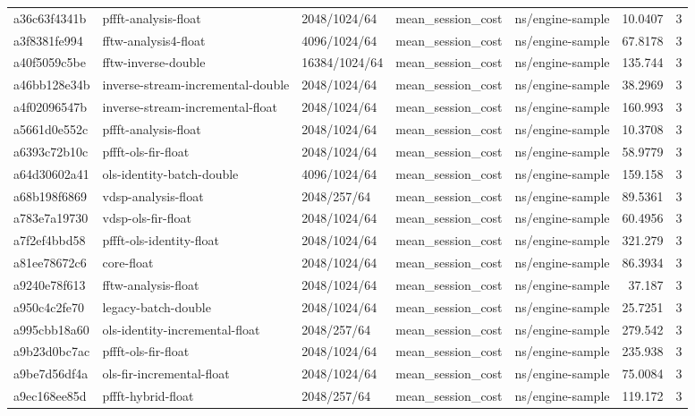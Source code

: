 \begin{longtable}{lllllrr}
a36c63f4341b & pffft-analysis-float & 2048/1024/64 & mean\_session\_cost & ns/engine-sample & 10.0407 & 3 \\
a3f8381fe994 & fftw-analysis4-float & 4096/1024/64 & mean\_session\_cost & ns/engine-sample & 67.8178 & 3 \\
a40f5059c5be & fftw-inverse-double & 16384/1024/64 & mean\_session\_cost & ns/engine-sample & 135.744 & 3 \\
a46bb128e34b & inverse-stream-incremental-double & 2048/1024/64 & mean\_session\_cost & ns/engine-sample & 38.2969 & 3 \\
a4f02096547b & inverse-stream-incremental-float & 2048/1024/64 & mean\_session\_cost & ns/engine-sample & 160.993 & 3 \\
a5661d0e552c & pffft-analysis-float & 2048/1024/64 & mean\_session\_cost & ns/engine-sample & 10.3708 & 3 \\
a6393c72b10c & pffft-ols-fir-float & 2048/1024/64 & mean\_session\_cost & ns/engine-sample & 58.9779 & 3 \\
a64d30602a41 & ols-identity-batch-double & 4096/1024/64 & mean\_session\_cost & ns/engine-sample & 159.158 & 3 \\
a68b198f6869 & vdsp-analysis-float & 2048/257/64 & mean\_session\_cost & ns/engine-sample & 89.5361 & 3 \\
a783e7a19730 & vdsp-ols-fir-float & 2048/1024/64 & mean\_session\_cost & ns/engine-sample & 60.4956 & 3 \\
a7f2ef4bbd58 & pffft-ols-identity-float & 2048/1024/64 & mean\_session\_cost & ns/engine-sample & 321.279 & 3 \\
a81ee78672c6 & core-float & 2048/1024/64 & mean\_session\_cost & ns/engine-sample & 86.3934 & 3 \\
a9240e78f613 & fftw-analysis-float & 2048/1024/64 & mean\_session\_cost & ns/engine-sample & 37.187 & 3 \\
a950c4c2fe70 & legacy-batch-double & 2048/1024/64 & mean\_session\_cost & ns/engine-sample & 25.7251 & 3 \\
a995cbb18a60 & ols-identity-incremental-float & 2048/257/64 & mean\_session\_cost & ns/engine-sample & 279.542 & 3 \\
a9b23d0bc7ac & pffft-ols-fir-float & 2048/1024/64 & mean\_session\_cost & ns/engine-sample & 235.938 & 3 \\
a9be7d56df4a & ols-fir-incremental-float & 2048/1024/64 & mean\_session\_cost & ns/engine-sample & 75.0084 & 3 \\
a9ec168ee85d & pffft-hybrid-float & 2048/257/64 & mean\_session\_cost & ns/engine-sample & 119.172 & 3 \\

\end{longtable}
